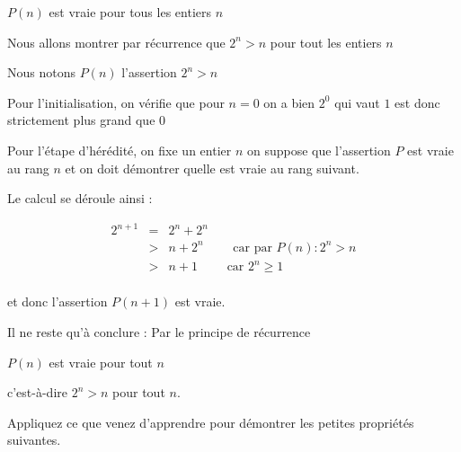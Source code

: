 $P(n)$ est vraie pour tous les entiers $n$


\diapo


Nous allons montrer par récurrence que 
$2^n > n$ pour tout les entiers $n$


\change

Nous notons $P(n)$ l'assertion $2^n > n$ 

Pour l'initialisation, on vérifie que pour $n=0$ on a bien
$2^0$ qui vaut $1$ est donc strictement plus grand que $0$

\change

Pour l'étape d'hérédité, on fixe un entier $n$
on suppose que l'assertion $P$ est vraie au rang $n$
et on doit démontrer quelle est vraie au rang suivant.

\change

Le calcul se déroule ainsi :

$$\begin{array}{rcl}
 2^{n+1} &=& 2^n + 2^n \\
         &>& n + 2^n \qquad \text{ car par } P(n) : 2^n > n \\
         &>& n + 1 \qquad \text{ car } 2^n \ge 1 \\
\end{array}$$

et donc l'assertion $P(n+1)$ est vraie.


\change


Il ne reste qu'à conclure : Par le principe de récurrence 

$P(n)$ est vraie pour tout $n$

c'est-à-dire $2^n > n$ pour tout $n$.




\diapo

Appliquez ce que venez d'apprendre pour démontrer 
les petites propriétés suivantes.


